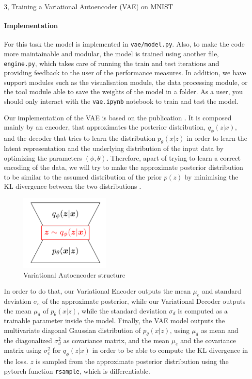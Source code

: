 \begin{task}{3, Training a Variational Autoencoder (VAE) on MNIST}
\paragraph{Implementation} For this task the model is implemented in \verb|vae/model.py|. Also, to make the code more maintainable and modular, the model is trained using another file, \verb|engine.py|, which takes care of running the train and test iterations and providing feedback to the user of the performance measures. In addition, we have support modules such as the visualisation module, the data processing module, or the tool module able to save the weights of the model in a folder. As a user, you should only interact with the \verb|vae.ipynb| notebook to train and test the model.

Our implementation of the VAE is based on the publication \cite{kingma2013auto}. It is composed mainly by an encoder, that approximates the posterior distribution, \(q_\phi (z|x)\), and the decoder that tries to learn the distribution \(p_\theta (x|z)\) in order to learn the latent representation and the underlying distribution of the input data by optimizing the parameters \((\phi, \theta)\). Therefore, apart of trying to learn a correct encoding of the data, we will try to make the approximate posterior distribution to be similar to the assumed distribution of the prior \(p(z)\) by minimising the KL divergence between the two distributions \cite{kullback1951information}.

\begin{figure}[H]
    \centering
    \includegraphics[width=0.4\textwidth]{images/vae.png}
    \caption{Variational Autoencoder structure}
    \label{vaestruct}
\end{figure}

In order to do that, our Variational Encoder outputs the mean \(\mu_e\) and standard deviation \(\sigma_e\) of the approximate posterior, while our Variational Decoder outputs the mean \(\mu_d\) of \(p_\theta (x|z)\), while the standard deviation \(\sigma_d\) is computed as a trainable parameter inside the model. Finally, the VAE model outputs the multivariate diagonal Gaussian distribution of \(p_\theta (x|z)\), using \(\mu_d\) as mean and the diagonalized \(\sigma_d^2\) as covariance matrix, and the mean \(\mu_e\) and the covariance matrix using \(\sigma_e^2\) for \(q_\phi (z|x)\) in order to be able to compute the KL divergence in the loss. \(z\) is sampled from the approximate posterior distribution using the pytorch function \verb|rsample|, which is differentiable.


\end{task}
